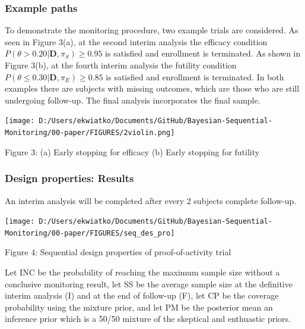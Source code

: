 \documentclass[12pt]{article}
\begin{document}
\subsubsection{Example paths}
To demonstrate the monitoring procedure, two example trials are considered. As seen in Figure 3(a), at the second interim analysis the efficacy condition $P(\theta>0.20|\mathbf{D},\pi_S)\geq 0.95$ is satisfied and enrollment is terminated. As shown in Figure 3(b), at the fourth interim analysis the futility condition $P(\theta\leq 0.30|\mathbf{D},\pi_E)\geq 0.85$ is satisfied and enrollment is terminated. In both examples there are subjects with missing outcomes, which are those who are still undergoing follow-up. The final analysis incorporates the final sample.
\begin{center}
\texttt{[image: D:/Users/ekwiatko/Documents/GitHub/Bayesian-Sequential-Monitoring/00-paper/FIGURES/2violin.png]}

Figure 3: (a) Early stopping for efficacy (b) Early stopping for futility
\end{center}

\newpage
\subsubsection{Design properties: Results}
An interim analysis will be completed after every 2 subjects complete follow-up.
\begin{center}
\texttt{[image: D:/Users/ekwiatko/Documents/GitHub/Bayesian-Sequential-Monitoring/00-paper/FIGURES/seq\_des\_pro]}

Figure 4: Sequential design properties of proof-of-activity trial
\end{center}
Let INC be the probability of reaching the maximum sample size without a conclusive monitoring result, let SS be the average sample size at the definitive interim analysis (I) and at the end of follow-up (F), let CP be the coverage probability using the mixture prior, and let PM be the posterior mean an inference prior which is a 50/50 mixture of the skeptical and enthuastic priors.
\newpage
\end{document}

